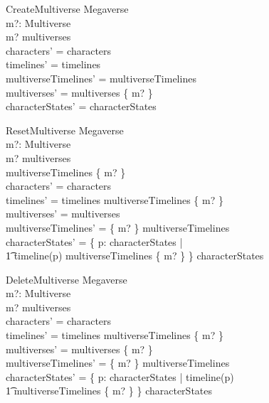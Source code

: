 \documentclass{article}
\begin{document}
\begin{schema}{CreateMultiverse}
\Delta Megaverse \\
m?: Multiverse \\
\where
m? \notin multiverses \\
characters' = characters \\
timelines' = timelines \\
multiverseTimelines' = multiverseTimelines \\
multiverses' = multiverses \cup \{ m? \} \\ 
characterStates' = characterStates \\
\end{schema}

\begin{schema}{ResetMultiverse}
\Delta Megaverse \\
m?: Multiverse \\
\where
m? \in multiverses \\
multiverseTimelines \limg \{ m? \} \rimg \neq \emptyset \\
characters' = characters \\
timelines' = timelines \setminus multiverseTimelines \limg \{ m? \} \rimg   \\
multiverses' = multiverses \\
multiverseTimelines' = \{ m? \} \ndres multiverseTimelines \\
characterStates' = \{ p: \dom characterStates | \\
\t1 timeline(p) \in multiverseTimelines \limg \{ m? \} \rimg 
\} \ndres characterStates \\
\end{schema} 

\begin{schema}{DeleteMultiverse}
\Delta Megaverse \\
m?: Multiverse \\
\where
m? \in multiverses \\
characters' = characters \\
timelines' = timelines \setminus multiverseTimelines \limg \{ m? \} \rimg   \\
multiverses' = multiverses \setminus \{ m? \} \\
multiverseTimelines' = \{ m? \} \ndres multiverseTimelines \\
characterStates' = \{ p: \dom characterStates | timeline(p) \\
\t1 \in multiverseTimelines \limg \{ m? \} \rimg \} \ndres characterStates \\
\end{schema} 
\end{document}
